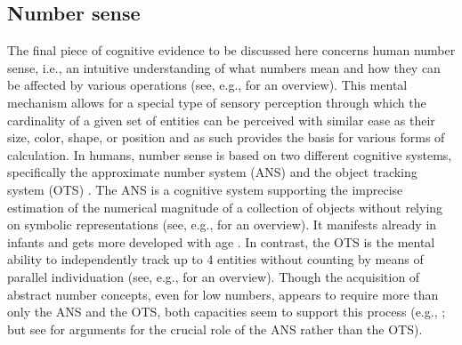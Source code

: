 \subsection{Number sense}\label{sec:number-sense}

The final piece of cognitive evidence to be discussed here concerns human number sense, i.e., an intuitive understanding of what numbers mean and how they can be affected by various operations (see, e.g., \citealt{dehaene1997number} for an overview). This mental mechanism allows for a special type of sensory perception through which the cardinality of a given set of entities can be perceived with similar ease as their size, color, shape, or position and as such provides the basis for various forms of calculation. In humans, number sense is based on two different cognitive systems, specifically the approximate number system (ANS) and the object tracking system (OTS) \citep[see, e.g.,][]{hyde2011two}. The ANS is a cognitive system supporting the imprecise estimation of the numerical magnitude of a collection of objects without relying on symbolic representations (see, e.g., \citealt{feigenson_et-al2004core,nieder_dehaene2009representation} for an overview). It manifests already in infants and gets more developed with age \citep{cantlon_et-al2006functional}. In contrast, the OTS is the mental ability to independently track up to 4 entities without counting by means of parallel individuation (see, e.g., \citealt{carey1998knowledge,carey2009origin} for an overview). Though the acquisition of abstract number concepts, even for low numbers, appears to require more than only the ANS and the OTS, both capacities seem to support this process (e.g., \citealt{hyde2011two}; but see \citealt{piazza2010neurocognitive} for arguments for the crucial role of the ANS rather than the OTS).

